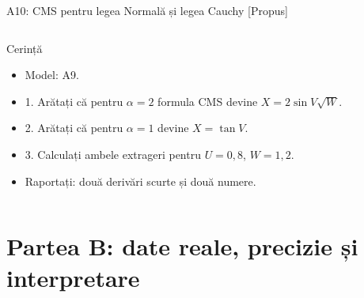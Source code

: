 \begin{frame}{A10: CMS pentru legea Normală și legea Cauchy [Propus]}
\propsub
\itemsize{\footnotesize}
\begin{columns}[T]
\begin{column}{\taskw}
\begin{block}{Cerință}
\begin{itemize}
    \item Model: A9.
    \item 1. Arătați că pentru $\alpha = 2$ formula CMS devine $X = 2\sin V\sqrt{W}$.
    \item 2. Arătați că pentru $\alpha = 1$ devine $X = \tan V$.
    \item 3. Calculați ambele extrageri pentru $U = 0{,}8$, $W = 1{,}2$.
    \item Raportați: două derivări scurte și două numere.
\end{itemize}
\end{block}
\end{column}
\begin{column}{\solw}
\end{column}
\end{columns}
\end{frame}


\section{Partea B: date reale, precizie și interpretare}

